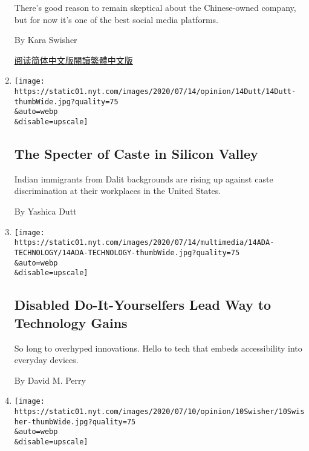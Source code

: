 \begin{enumerate}
  There's good reason to remain skeptical about the Chinese-owned
  company, but for now it's one of the best social media platforms.

  By Kara Swisher

  \href{https://cn.nytimes.com/opinion/20200720/tiktok-ban-china/}{阅读简体中文版}\href{https://cn.nytimes.com/opinion/20200720/tiktok-ban-china/zh-hant/}{閱讀繁體中文版}
\item
  \href{/2020/07/14/opinion/caste-cisco-indian-americans-discrimination.html}{}

  \texttt{[image: https://static01.nyt.com/images/2020/07/14/opinion/14Dutt/14Dutt-thumbWide.jpg?quality=75\\\&auto=webp\\\&disable=upscale]}

  \hypertarget{the-specter-of-caste-in-silicon-valley}{%
  \subsection{The Specter of Caste in Silicon
  Valley}\label{the-specter-of-caste-in-silicon-valley}}

  Indian immigrants from Dalit backgrounds are rising up against caste
  discrimination at their workplaces in the United States.

  By Yashica Dutt
\item
  \href{/2020/07/14/style/assistive-technology.html}{}

  \texttt{[image: https://static01.nyt.com/images/2020/07/14/multimedia/14ADA-TECHNOLOGY/14ADA-TECHNOLOGY-thumbWide.jpg?quality=75\\\&auto=webp\\\&disable=upscale]}

  \hypertarget{disabled-do-it-yourselfers-lead-way-to-technology-gains}{%
  \subsection{Disabled Do-It-Yourselfers Lead Way to Technology
  Gains}\label{disabled-do-it-yourselfers-lead-way-to-technology-gains}}

  So long to overhyped innovations. Hello to tech that embeds
  accessibility into everyday devices.

  By David M. Perry
\item
  \href{/2020/07/10/opinion/facebook-zuckerberg.html}{}

  \texttt{[image: https://static01.nyt.com/images/2020/07/10/opinion/10Swisher/10Swisher-thumbWide.jpg?quality=75\\\&auto=webp\\\&disable=upscale]}

  \hypertarget{zuckerberg-never-fails-to-disappoint}{%
}
\end{enumerate}
